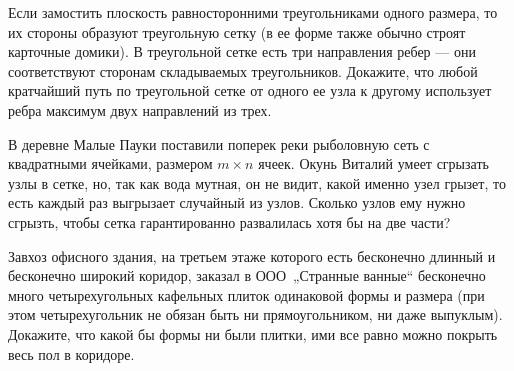 ﻿
\begin{enumerate}

\itA Если замостить плоскость равносторонними треугольниками одного размера, то их стороны образуют треугольную сетку (в ее форме также обычно строят карточные домики). В треугольной сетке есть три направления ребер — они соответствуют сторонам складываемых треугольников. Докажите, что любой кратчайший путь по треугольной сетке от одного ее узла к другому использует ребра максимум двух направлений из трех.

\itB В деревне Малые Пауки поставили поперек реки рыболовную сеть с квадратными ячейками, размером $m \times n$ ячеек. Окунь Виталий умеет сгрызать узлы в сетке, но, так как вода мутная, он не видит, какой именно узел грызет, то есть каждый раз выгрызает случайный из узлов. Сколько узлов ему нужно сгрызть, чтобы сетка гарантированно развалилась хотя бы на две части?

\itC Завхоз офисного здания, на третьем этаже которого есть бесконечно длинный и бесконечно широкий коридор, заказал в ООО~„Странные ванные“ бесконечно много четырехугольных кафельных плиток одинаковой формы и размера (при этом четырехугольник не обязан быть ни прямоугольником, ни даже выпуклым). Докажите, что какой бы формы ни были плитки, ими все равно можно покрыть весь пол в коридоре.
\end{enumerate}
